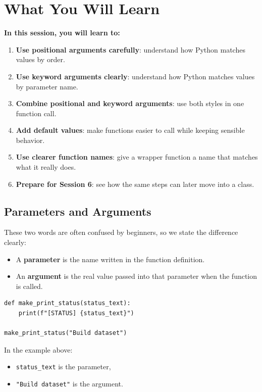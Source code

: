 \section{What You Will Learn}
\textbf{In this session, you will learn to:}
\begin{enumerate}\setlength{\itemsep}{5pt}
\item \textbf{Use positional arguments carefully}: understand how Python matches values by order.
\item \textbf{Use keyword arguments clearly}: understand how Python matches values by parameter name.
\item \textbf{Combine positional and keyword arguments}: use both styles in one function call.
\item \textbf{Add default values}: make functions easier to call while keeping sensible behavior.
\item \textbf{Use clearer function names}: give a wrapper function a name that matches what it really does.
\item \textbf{Prepare for Session 6}: see how the same steps can later move into a class.
\end{enumerate}

\subsection{Parameters and Arguments}
These two words are often confused by beginners, so we state the difference clearly:
\begin{itemize}
    \item A \textbf{parameter} is the name written in the function definition.
    \item An \textbf{argument} is the real value passed into that parameter when the function is called.
\end{itemize}

\begin{verbatim}
def make_print_status(status_text):
    print(f"[STATUS] {status_text}")

make_print_status("Build dataset")
\end{verbatim}

In the example above:
\begin{itemize}
    \item \texttt{status\_text} is the parameter,
    \item \texttt{"Build dataset"} is the argument.
\end{itemize}

